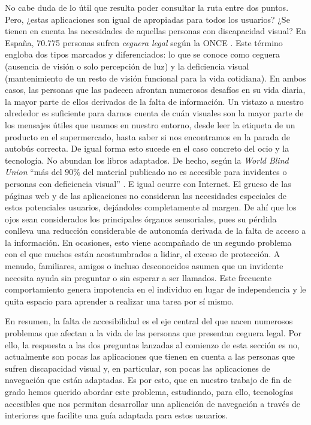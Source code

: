 No cabe duda de lo útil que resulta poder consultar la ruta entre dos puntos. Pero, ¿estas aplicaciones son igual de apropiadas para todos los usuarios? ¿Se tienen en cuenta las necesidades de aquellas personas con discapacidad visual? En España, 70.775 personas sufren \textit{ceguera legal} según la ONCE \citep{informeceguera}. Este término engloba dos tipos marcados y diferenciados: lo que se conoce como ceguera (ausencia de visión o solo percepción de luz) y la deficiencia visual (mantenimiento de un resto de visión funcional para la vida cotidiana). En ambos casos, las personas que las padecen afrontan numerosos desafíos en su vida diaria, la mayor parte de ellos derivados de la falta de información. Un vistazo a nuestro alrededor es suficiente para darnos cuenta de cuán visuales son la mayor parte de los mensajes útiles que usamos en nuestro entorno, desde leer la etiqueta de un producto en el supermercado, hasta saber si nos encontramos en la parada de autobús correcta. De igual forma esto sucede en el caso concreto del ocio y la tecnología. No abundan los libros adaptados. De hecho, según la \textit{World Blind Union} ``más del $90\%$ del material publicado no es accesible para invidentes o personas con deficiencia visual'' \citep{envision}. E igual ocurre con Internet. El grueso de las páginas web y de las aplicaciones no consideran las necesidades especiales de estos potenciales usuarios, dejándoles completamente al margen. De ahí que los ojos sean considerados los principales órganos sensoriales, pues su pérdida conlleva una reducción considerable de autonomía derivada de la falta de acceso a la información. En ocasiones, esto viene acompañado de un segundo problema con el que muchos están acostumbrados a lidiar, el exceso de protección. A menudo, familiares, amigos o incluso desconocidos asumen que un invidente necesita ayuda sin preguntar o sin esperar a ser llamados. Este frecuente comportamiento genera impotencia en el individuo en lugar de independencia y le quita espacio para aprender a realizar una tarea por sí mismo. 

En resumen, la falta de accesibilidad es el eje central del que nacen numerosos problemas que afectan a la vida de las personas que presentan ceguera legal. Por ello, la respuesta a las dos preguntas lanzadas al comienzo de esta sección es no, actualmente son pocas las aplicaciones que tienen en cuenta a las personas que sufren discapacidad visual y, en particular, son pocas las aplicaciones de navegación que están adaptadas. Es por esto, que en nuestro trabajo de fin de grado hemos querido abordar este problema, estudiando, para ello, tecnologías accesibles que nos permitan desarrollar una aplicación de navegación a través de interiores que facilite una guía adaptada para estos usuarios.

